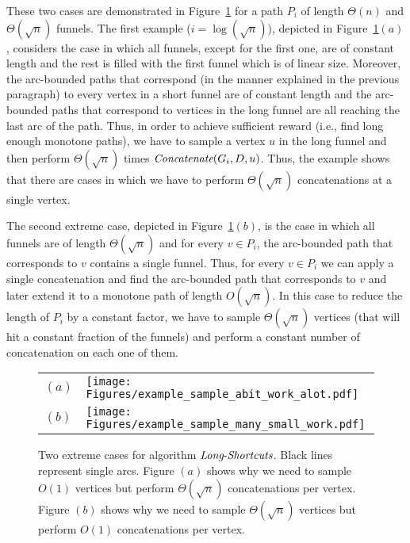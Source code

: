 \documentclass[11pt]{article}
\newcommand{\Concat}{\mbox{{\it Concatenate}}}
\newcommand{\LS}{\mbox{{\it Long}-{\it Shortcuts}}}
\begin{document}
These two cases are demonstrated in Figure~\ref{fig:example-different-sampling} for a path $P_i$ of length $\Theta(n)$  and 
$\Theta(\sqrt{n})$ funnels. The first example ($i=\log (\sqrt{n})$), depicted in Figure~\ref{fig:example-different-sampling}$(a)$, considers the case in which all funnels, except for the first one, are of constant length
and the rest is filled with the first funnel which is of linear size.
Moreover, the arc-bounded paths that correspond (in the manner explained in the previous paragraph) to every vertex in a short funnel are of constant length and the arc-bounded paths that correspond to vertices in the long funnel are all reaching the last arc of the path. Thus, in order to achieve sufficient reward (i.e., find long enough monotone paths), we  have to sample a vertex $u$ in the long funnel and then perform $\Theta(\sqrt{n})$ times $\Concat(G_i, D, u)$. Thus, the example shows that there are cases in which we have to perform $\Theta(\sqrt{n})$ concatenations at a single vertex. 

The second extreme case, depicted in Figure~\ref{fig:example-different-sampling}$(b)$, is the case in which all funnels are of length $\Theta(\sqrt{n})$ and for every $v\in P_i$, the arc-bounded path that corresponds to $v$ contains a single funnel. Thus, for every $v\in P_i$ we can apply a single concatenation and find the arc-bounded path that corresponds to $v$ and later extend it to a monotone path of length $O(\sqrt{n})$. In this case to reduce the length of $P_i$ by a constant factor, we  have to sample $\Theta(\sqrt{n})$ vertices (that will hit a constant fraction of the funnels) and perform a constant number of concatenation on each one of them.


\begin{figure}[ht!]
    \centering
    \begin{tabular}{m{} m{}} $(a)$ & \texttt{[image: Figures/example\_sample\_abit\_work\_alot.pdf]} \\[1em]
        $(b)$ & \texttt{[image: Figures/example\_sample\_many\_small\_work.pdf]} \\[1em]
    \end{tabular}
    \caption{Two extreme cases for algorithm $\LS$. Black lines represent single arcs. Figure $(a)$ shows why we need to sample $O(1)$ vertices but perform $\Theta(\sqrt{n})$ concatenations per vertex. Figure $(b)$ shows why we need to sample $\Theta(\sqrt{n})$ vertices but perform $O(1)$ concatenations per vertex. \label{fig:example-different-sampling}}  
\end{figure}
\end{document}
